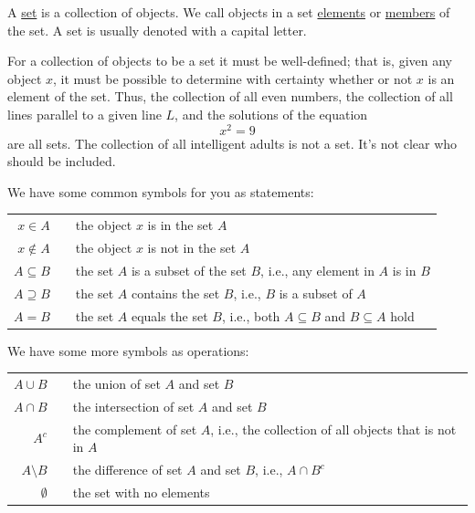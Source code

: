 \documentclass[11pt]{book}
\theoremstyle{break}
\theoremstyle{no_label}
\numberwithin{equation}{section}
\begin{document}
\begin{definition}[Set]
    A \underline{set} is a collection of objects. We call objects in a set \underline{elements} or \underline{members} of the set. A set is usually denoted with a capital letter.
\end{definition}

For a collection of objects to be a set it must be well-defined; that is, given any object $x$, it must be possible to determine with certainty whether or not $x$ is an element of the set. Thus, the collection of all even numbers, the collection of all lines parallel to a given line $L$, and the solutions of the equation $$x^2 = 9$$ are all sets. The collection of all intelligent adults is not a set. It's not clear who should be included.

\begin{notation}
    We have some common symbols for you as statements:
    \begin{center}
        \begin{tabular}{rcl}
            $x\in A$ && the object $x$ is in the set $A$\\
            $x\notin A$ && the object $x$ is not in the set $A$\\
            $A\subseteq B$ && the set $A$ is a subset of the set $B$, i.e., any element in $A$ is in $B$\\
            $A\supseteq B$ && the set $A$ contains the set $B$, i.e., $B$ is a subset of $A$\\
            $A=B$ && the set $A$ equals the set $B$, i.e., both $A\subseteq B$ and $B\subseteq A$ hold
        \end{tabular}
    \end{center}
    We have some more symbols as operations:
    \begin{center}
        \begin{tabular}{rcl}
            $A\cup B$ && the union of set $A$ and set $B$\\
            $A\cap B$ && the intersection of set $A$ and set $B$\\
            $A^c$ && the complement of set $A$, i.e., the collection of all objects that is not in $A$\\
            $A\setminus B$ && the difference of set $A$ and set $B$, i.e., $A\cap B^c$\\
            $\emptyset$ && the set with no elements
        \end{tabular}
    \end{center}
\end{notation}
\end{document}
